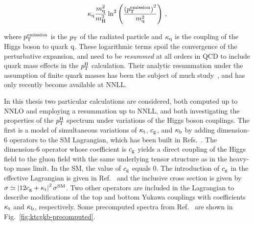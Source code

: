 % 
\begin{linenomath*}
\begin{equation}
\kappa_{\mathrm{q}} \frac{m_{\mathrm{q}}^2}{m_{\mathrm{H}}^2}
    \ln^2 \left(
        \frac{
            \left( p_\mathrm{T}^\text{emission} \right)^2
            }{
            m_\mathrm{q}^2
            }
        \right)
\,,
\end{equation}
\end{linenomath*}
% 
where $p_\mathrm{T}^\text{emission}$ is the $p_\mathrm{T}$ of the radiated particle and $\kappa_{\mathrm{q}}$ is the coupling of the Higgs boson to quark $\mathrm{q}$.
% 
These logarithmic terms spoil the convergence of the perturbative expansion, and need to be \textit{resummed} at all orders in QCD to include quark mass effects in the $p_\mathrm{T}^\mathrm{H}$ calculation.
% 
Their analytic resummation under the assumption of finite quark masses has been the subject of much study~\cite{Bozzi:2003jy,Becher:2010tm,Mantler:2012bj,Grazzini:2013mca,Monni:2016ktx}, and has only recently become available at NNLL.


In this thesis two particular calculations are considered, both computed up to NNLO and employing a resummation up to NNLL, and both investigating the properties of the $p_\mathrm{T}^\mathrm{H}$ spectrum under variations of the Higgs boson couplings.
% 
The first is a model of simultaneous variations of $\kappa_{\mathrm{t}}$, $c_\mathrm{g}$, and $\kappa_{\mathrm{b}}$ by adding dimension-6 operators to the SM Lagrangian, which has been built in Refs.~\cite{Grazzini:2017szg,Grazzini:2016paz}.
% 
The dimension-6 operator whose coefficient is $c_\mathrm{g}$ yields a direct coupling of the Higgs field to the gluon field with the same underlying tensor structure as in the heavy-top mass limit.
% 
In the SM, the value of $c_\mathrm{g}$ equals 0.
% 
The introduction of $c_\mathrm{g}$ in the effective Lagrangian is given in Ref.~\cite{Grazzini:2016paz} and the inclusive cross section is given by $\sigma \simeq \left| 12c_\mathrm{g} + \kappa_{\mathrm{t}} \right|^2 \sigma^\text{SM}$.
% 
Two other operators are included in the Lagrangian to describe modifications of the top and bottom Yukawa couplings with coefficients $\kappa_{\mathrm{t}}$ and $\kappa_{\mathrm{b}}$, respectively.
% 
Some precomputed spectra from Ref.~\cite{Grazzini:2017szg} are shown in Fig.~\ref{fig:ktcgkb-precomputed}.


